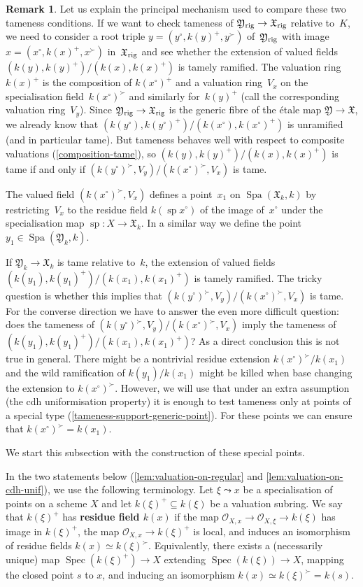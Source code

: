 \documentclass[a4paper,twoside,11pt,reqno]{amsart}
\newcommand{\cO}{{\mathcal O}}
\newcommand{\fX}{{\mathfrak{X}}}
\newcommand{\fY}{{\mathfrak{Y}}}
\DeclareMathOperator{\Spec}{Spec}
\DeclareMathOperator{\Spa}{Spa}
\DeclareMathOperator{\spe}{sp}
\newcommand{\rig}{{\rm rig}}
\theoremstyle{definition}
\newtheorem{rmk}[thm]{Remark}
\numberwithin{equation}{subsection}
\begin{document}
\begin{rmk}
Let us explain the principal mechanism used to compare these two tameness conditions.
If we want to check tameness of $\fY_\rig \to \fX_\rig$ relative to~$K$, we need to consider a root triple $y = (y^\circ,k(y)^+,y^\succ)$ of~$\fY_\rig$ with image $x = (x^\circ,k(x)^+,x^\succ)$ in~$\fX_\rig$ and see whether the extension of valued fields $(k(y),k(y)^+)/(k(x),k(x)^+)$ is tamely ramified.
The valuation ring~$k(x)^+$ is the composition of $k(x^\circ)^+$ and a valuation ring~$V_x$ on the specialisation field~$k(x^\circ)^\succ$ and similarly for~$k(y)^+$ (call the corresponding valuation ring~$V_y$).
Since $\fY_\rig \to \fX_\rig$ is the generic fibre of the \'etale map $\fY\to \fX$, we already know that $(k(y^\circ),k(y^\circ)^+)/(k(x^\circ),k(x^\circ)^+)$ is unramified (and in particular tame).
But tameness behaves well with respect to composite valuations (\cref{composition-tame}), so $(k(y),k(y)^+)/(k(x),k(x)^+)$ is tame if and only if $(k(y^\circ)^\succ,V_y)/(k(x^\circ)^\succ,V_x)$ is tame.

The valued field $(k(x^\circ)^\succ,V_x)$ defines a point~$x_1$ on $\Spa(\fX_k,k)$ by restricting~$V_x$ to the residue field $k(\spe x^\circ)$ of the image of~$x^\circ$ under the specialisation map $\spe \colon X \to \fX_k$.
In a similar way we define the point $y_1  \in \Spa(\fY_k,k)$. 

If $\fY_k \to \fX_k$ is tame relative to~$k$, the extension of valued fields $(k(y_1),k(y_1)^+)/(k(x_1),k(x_1)^+)$ is tamely ramified.
The tricky question is whether this implies that $(k(y^\circ)^\succ,V_y)/(k(x^\circ)^\succ,V_x)$ is tame.
For the converse direction we have to answer the even more difficult question: does the tameness of $(k(y^\circ)^\succ,V_y)/(k(x^\circ)^\succ,V_x)$ imply the tameness of $(k(y_1),k(y_1)^+)/(k(x_1),k(x_1)^+)$?
As a direct conclusion this is not true in general. 
There might be a nontrivial residue extension $k(x^\circ)^\succ/k(x_1)$ and the wild ramification of $k(y_1)/k(x_1)$ might be killed when base changing the extension to $k(x^\circ)^\succ$.
However, we will use that under an extra assumption (the cdh uniformisation property) it is enough to test tameness only at points of a special type (\cref{tameness-support-generic-point}).
For these points we can ensure that $k(x^\circ)^\succ = k(x_1)$.

We start this subsection with the construction of these special points.
\end{rmk}

In the two statements below (\cref{lem:valuation-on-regular} and \cref{lem:valuation-on-cdh-unif}), we use the following terminology. Let $\xi\leadsto x$ be a specialisation of points on a scheme $X$ and let $k(\xi)^+\subseteq k(\xi)$ be a valuation subring. We say that $k(\xi)^+$ has {\bf residue field $k(x)$} if the map $\cO_{X,x}\to \cO_{X,\xi}\to k(\xi)$ has image in $k(\xi)^+$, the map $\cO_{X,x}\to k(\xi)^+$ is local, and induces an isomorphism of residue fields $k(x)\simeq k(\xi)^\succ$. Equivalently, there exists a (necessarily unique) map $\Spec(k(\xi)^+)\to X$ extending $\Spec(k(\xi))\to X$, mapping the closed point $s$ to $x$, and inducing an isomorphism $k(x)\simeq k(\xi)^\succ =k(s)$. 
\end{document}
